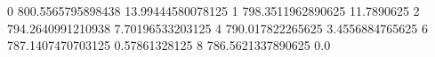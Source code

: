 0 800.5565795898438 13.99444580078125
1 798.3511962890625 11.7890625
2 794.2640991210938 7.70196533203125
4 790.017822265625 3.4556884765625
6 787.1407470703125 0.57861328125
8 786.5621337890625 0.0
